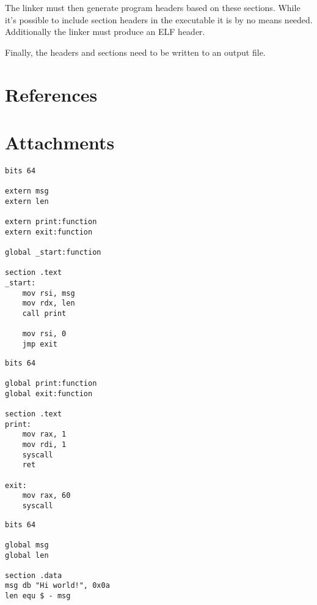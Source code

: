 \documentclass{article}
\begin{document}
The linker must then generate program headers based on these sections. While it's possible to include section headers in the executable it is by no means needed. Additionally the linker must produce an ELF header.

Finally, the headers and sections need to be written to an output file.

\section{References}
\printbibliography[heading=none]

\section{Attachments}

\begin{verbatim}
bits 64

extern msg
extern len

extern print:function
extern exit:function

global _start:function

section .text
_start:
    mov rsi, msg
    mov rdx, len
    call print

    mov rsi, 0
    jmp exit
\end{verbatim}

\begin{verbatim}
bits 64

global print:function
global exit:function

section .text
print:
    mov rax, 1
    mov rdi, 1
    syscall
    ret

exit:
    mov rax, 60
    syscall
\end{verbatim}

\begin{verbatim}
bits 64

global msg
global len

section .data
msg db "Hi world!", 0x0a
len equ $ - msg
\end{verbatim}
\end{document}
